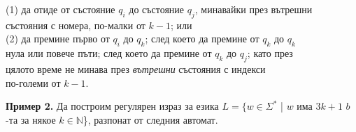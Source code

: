 \documentclass{article}
\begin{document}
    (1) да отиде от състояние $q_i$ до състояние $q_j$, минавайки през вътрешни \\
    \hspace{13pt}    състояния с номера, по-малки от $k-1$; или \\
    (2) да премине първо от $q_i$ до $q_k$; след което да премине от $q_k$ до $q_k$ \\
    \hspace{13pt}    нула или повече пъти; след което да премине от $q_k$ до $q_j$; като през \\
    \hspace{13pt}    цялото време не минава през \textit{вътрешни} състояния с индекси \\
    \hspace{13pt}    по-големи от $k-1$. 

    \vspace{15pt}

    \textbf{Пример 2.} Да построим регулярен израз за езика 
    $L = \{w \in \Sigma^*$ | $w$ има $3k + 1$ $b$-та за някое $k \in \mathbb{N}$\}, разпонат от следния автомат.
    \begin{center}
    \end{center}
\end{document}

